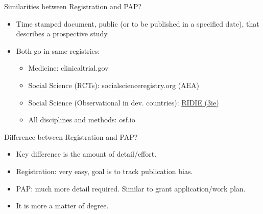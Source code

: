 \documentclass{beamer}
\begin{document}
\begin{frame}{Similarities between Registration and PAP?}

\begin{itemize}
\tightlist
\item
  Time stamped document, public (or to be published in a specified
  date), that describes a prospective study.
\item
  Both go in same registries:

  \begin{itemize}
  \tightlist
  \item
    Medicine: clinicaltrial.gov
  \item
    Social Science (RCTs): socialscienceregistry.org (AEA)
  \item
    Social Science (Observational in dev. countries):
    \href{http://www.3ieimpact.org/en/evaluation/ridie/}{RIDIE (3ie)}
  \item
    All disciplines and methods: osf.io
  \end{itemize}
\end{itemize}

\end{frame}

\begin{frame}{Difference between Registration and PAP?}

\begin{itemize}
\tightlist
\item
  Key difference is the amount of detail/effort.
\item
  Registration: very easy, goal is to track publication bias.
\item
  PAP: much more detail required. Similar to grant application/work
  plan.
\item
  It is more a matter of degree.
\end{itemize}

\end{frame}
\end{document}
